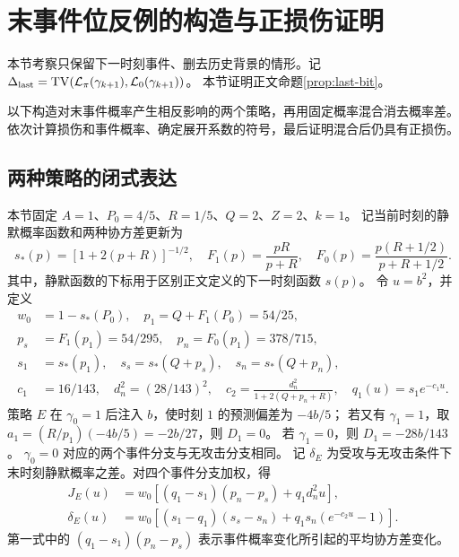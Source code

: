 \section{末事件位反例的构造与正损伤证明}
\label{app:last-bit}
本节考察只保留下一时刻事件、删去历史背景的情形。记
$\Delta_{\rm last}=\operatorname{TV}(\mathcal L_\pi(\gamma_{k+1}),\mathcal L_0(\gamma_{k+1}))$。
本节证明正文命题\ref{prop:last-bit}。

以下构造对末事件概率产生相反影响的两个策略，再用固定概率混合消去概率差。
依次计算损伤和事件概率、确定展开系数的符号，最后证明混合后仍具有正损伤。

\subsection{两种策略的闭式表达}


本节固定 $A=1$、$P_0=4/5$、$R=1/5$、$Q=2$、$Z=2$、$k=1$。
记当前时刻的静默概率函数和两种协方差更新为
\begin{equation}
 s_*(p)=[1+2(p+R)]^{-1/2},\quad
 F_1(p)=\frac{pR}{p+R},\quad
 F_0(p)=\frac{p(R+1/2)}{p+R+1/2}.
 \label{eq:counter-functions}
\end{equation}
其中，静默函数的下标用于区别正文定义的下一时刻函数 $s(p)$。
令 $u=b^2$，并定义
\begin{equation}
 \begin{split}
 w_0&=1-s_*(P_0),\quad p_1=Q+F_1(P_0)=54/25,\\
 p_s&=F_1(p_1)=54/295,\quad p_n=F_0(p_1)=378/715,\\
 s_1&=s_*(p_1),\quad s_s=s_*(Q+p_s),\quad s_n=s_*(Q+p_n),\\
 c_1&=16/143,\quad d_n^2=(28/143)^2,\quad
 c_2=\frac{d_n^2}{1+2(Q+p_n+R)},\quad q_1(u)=s_1e^{-c_1u}.
 \end{split}
 \label{eq:counter-constants}
\end{equation}
策略 $E$ 在 $\gamma_0=1$ 后注入 $b$，使时刻 $1$ 的预测偏差为 $-4b/5$；
若又有 $\gamma_1=1$，取
$a_1=(R/p_1)(-4b/5)=-2b/27$，则 $D_1=0$。
若 $\gamma_1=0$，则 $D_1=-28b/143$。
$\gamma_0=0$ 对应的两个事件分支与无攻击分支相同。
记 $\delta_E$ 为受攻与无攻击条件下末时刻静默概率之差。对四个事件分支加权，得
\begin{align}
 J_E(u)&=w_0[(q_1-s_1)(p_n-p_s)+q_1d_n^2u],\\
 \delta_E(u)&=w_0[(s_1-q_1)(s_s-s_n)
                     +q_1s_n(e^{-c_2u}-1)].
 \label{eq:E-closed}
\end{align}
第一式中的 $(q_1-s_1)(p_n-p_s)$ 表示事件概率变化所引起的平均协方差变化。

